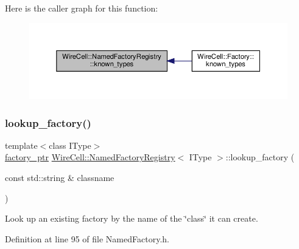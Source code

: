 Here is the caller graph for this function\+:
\nopagebreak
\begin{figure}[H]
\begin{center}
\leavevmode
\includegraphics[width=350pt]{class_wire_cell_1_1_named_factory_registry_ab48a0b93547621847770a26929691424_icgraph}
\end{center}
\end{figure}
\mbox{\label{class_wire_cell_1_1_named_factory_registry_a355e9be03e1950d63a14ae9bb2989918}} 
\subsubsection{\texorpdfstring{lookup\+\_\+factory()}{lookup\_factory()}}
{\footnotesize\ttfamily template$<$class I\+Type$>$ \\
\hyperlink{class_wire_cell_1_1_named_factory_registry_a4d693bf86f7a8a24ac7dc00d92d929cf}{factory\+\_\+ptr} \hyperlink{class_wire_cell_1_1_named_factory_registry}{Wire\+Cell\+::\+Named\+Factory\+Registry}$<$ I\+Type $>$\+::lookup\+\_\+factory (\begin{DoxyParamCaption}\item[{const std\+::string \&}]{classname }\end{DoxyParamCaption})\hspace{0.3cm}{\ttfamily [inline]}}



Look up an existing factory by the name of the \char`\"{}class\char`\"{} it can create. 



Definition at line 95 of file Named\+Factory.\+h.

